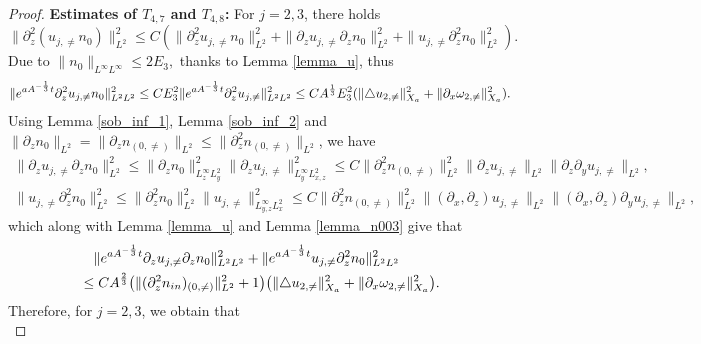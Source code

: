 \documentclass[12pt, reqno]{amsart}
\numberwithin{equation}{section}
\begin{document}
\begin{proof}
		\noindent\textbf{Estimates of $T_{4,7}$ and $T_{4,8}$:}
		For $j=2,3$, there holds $$\|
		\partial_z^2(u_{j,\neq}n_0)\|_{L^2}^2
		\leq C(\|\partial_z^2u_{j,\neq}n_0\|^2_{L^2}
		+\|\partial_zu_{j,\neq}\partial_zn_0\|^2_{L^2}
		+\|u_{j,\neq}\partial_z^2n_0\|^2_{L^2}).$$
		Due to $\|n_0\|_{L^{\infty}L^{\infty}}\leq 2E_3,$ thanks to  Lemma \ref{lemma_u}, thus 
		\begin{equation*}
			\begin{aligned}
				\|{\rm e}^{aA^{-\frac{1}{3}}t}\partial_z^2u_{j,\neq}n_0\|^2_{L^2L^2}
				\leq CE_3^2\|{\rm e}^{aA^{-\frac{1}{3}}t}\partial_z^2u_{j,\neq}\|^2_{L^2L^2}
				\leq CA^{\frac13}E_3^2(\|\triangle u_{2,\neq}\|^2_{X_a}
				+\|\partial_x\omega_{2,\neq}\|^2_{X_a}).
			\end{aligned}
		\end{equation*}
		Using Lemma \ref{sob_inf_1}, Lemma \ref{sob_inf_2}
		and $\|\partial_zn_{0}\|_{L^2}=\|\partial_zn_{(0,\neq)}\|_{L^2}\leq \|\partial_z^2n_{(0,\neq)}\|_{L^2}$, we have
		\begin{equation*}
			\begin{aligned}						\|\partial_zu_{j,\neq}\partial_zn_{0}\|^2_{L^2}\leq 
				\|\partial_zn_0\|^2_{L^{\infty}_zL^2_y}
				\|\partial_zu_{j,\neq}\|^2_{L^{\infty}_{y}L^2_{x,z}}
				\leq C\|\partial_z^2n_{(0,\neq)}\|^2_{L^2}
				\|\partial_zu_{j,\neq}\|_{L^2}
				\|\partial_z\partial_yu_{j,\neq}\|_{L^2},\\
				\|u_{j,\neq}\partial_z^2n_0\|^2_{L^2}\leq 
				\|\partial_z^2n_0\|^2_{L^2}\|u_{j,\neq}\|^2_{L^{\infty}_{y,z}L^2_x}
				\leq C\|\partial_z^2n_{(0,\neq)}\|^2_{L^2}
				\|(\partial_x,\partial_z)u_{j,\neq}\|_{L^2}
				\|(\partial_x,\partial_z)\partial_yu_{j,\neq}\|_{L^2},
			\end{aligned}
		\end{equation*}
		which along with Lemma \ref{lemma_u} and Lemma \ref{lemma_n003} give that 
		\begin{equation*}
			\begin{aligned}
				&\quad\|{\rm e}^{aA^{-\frac{1}{3}}t}\partial_zu_{j,\neq}
				\partial_zn_0\|^2_{L^2L^2}
				+\|{\rm e}^{aA^{-\frac{1}{3}}t}u_{j,\neq}
				\partial_z^2n_0\|^2_{L^2L^2}\\
				&\leq CA^{\frac23}\big(\|(\partial_z^2n_{\rm in})_{(0,\neq)}\|^2_{L^2}+1\big)\big(\|\triangle u_{2,\neq}\|^2_{X_a}
				+\|\partial_x\omega_{2,\neq}\|^2_{X_a}\big).
			\end{aligned}
		\end{equation*}
		Therefore, for $j=2,3$, we obtain that 
		\begin{equation}\label{temp1_6}

\end{equation}
\end{proof}
\end{document}
